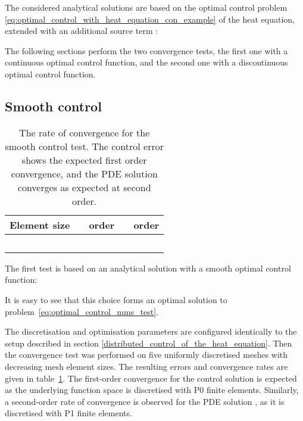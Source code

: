 \documentclass[prodmode,acmtoms]{acmsmall}
\newcommand{\ponecg}{\mbox{P1}\xspace}
\newcommand{\pzerodg}{\mbox{P0}\xspace}
\begin{document}
The considered analytical solutions are based on the optimal control problem \eqref{eq:optimal_control_with_heat_equation_con_example} of the heat equation, extended with an additional source term :



The following sections perform the two convergence tests, the first one with a continuous optimal control function, and the second one with a discontinuous optimal control function.

\subsection{Smooth control}



\begin{table}[t]
\centering
  \begin{tabular}{ccccc}
    Element size & \small{} & order & \small{} & order \\
    \hline
     &  &  &  & \\
     &  &  &  &  \\
     &  &  &  &  \\
     &  &  &  &  \\
     &  &  &  &  \\
  \end{tabular}
\caption{The rate of convergence for the smooth control test. The control error shows the expected first order convergence,
and the PDE solution converges as expected at second order.}
  \label{fig:rate_of_convergence_smooth}
\end{table}

The first test is based on an analytical solution with a smooth optimal control function:

It is easy to see that this choice forms an optimal solution to problem~\eqref{eq:optimal_control_mms_test}.

The discretisation and optimisation parameters are configured identically to the setup described in section \ref{distributed_control_of_the_heat_equation}. 
Then the convergence test was performed on five uniformly discretised meshes with decreasing mesh element sizes.
The resulting errors and convergence rates are given in table~\ref{fig:rate_of_convergence_smooth}.
The first-order convergence for the control solution  is expected as the underlying function space is discretised with \pzerodg finite elements. 
Similarly, a second-order rate of convergence is observed  for the PDE solution , as it is discretised with \ponecg finite elements. 
\end{document}
